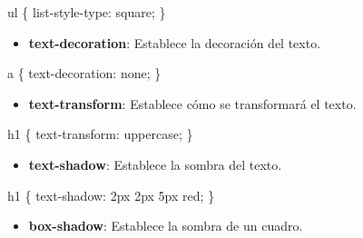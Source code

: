 \documentclass[
  a4paper,
  DIV=11,
  numbers=noendperiod,
  onepage,
  openany]{scrreprt}
\newenvironment{Shaded}{\begin{snugshade}}{\end{snugshade}}
\newcommand{\ConstantTok}[1]{\textcolor[rgb]{0.56,0.35,0.01}{#1}}
\newcommand{\DataTypeTok}[1]{\textcolor[rgb]{0.68,0.00,0.00}{#1}}
\newcommand{\DecValTok}[1]{\textcolor[rgb]{0.68,0.00,0.00}{#1}}
\newcommand{\KeywordTok}[1]{\textcolor[rgb]{0.00,0.23,0.31}{#1}}
\newcommand{\NormalTok}[1]{\textcolor[rgb]{0.00,0.23,0.31}{#1}}
\newcommand{\OperatorTok}[1]{\textcolor[rgb]{0.37,0.37,0.37}{#1}}
\providecommand{\tightlist}{%
  \setlength{\itemsep}{0pt}\setlength{\parskip}{0pt}}\usepackage{longtable,booktabs,array}
\begin{document}
\begin{Shaded}
\begin{Highlighting}[]
\NormalTok{ul \{}
  \KeywordTok{list{-}style{-}type}\NormalTok{: }\DecValTok{square}\OperatorTok{;}
\NormalTok{\}}
\end{Highlighting}
\end{Shaded}

\begin{itemize}
\tightlist
\item
  \textbf{text-decoration}: Establece la decoración del texto.
\end{itemize}

\begin{Shaded}
\begin{Highlighting}[]
\NormalTok{a \{}
  \KeywordTok{text{-}decoration}\NormalTok{: }\DecValTok{none}\OperatorTok{;}
\NormalTok{\}}
\end{Highlighting}
\end{Shaded}

\begin{itemize}
\tightlist
\item
  \textbf{text-transform}: Establece cómo se transformará el texto.
\end{itemize}

\begin{Shaded}
\begin{Highlighting}[]
\NormalTok{h1 \{}
  \KeywordTok{text{-}transform}\NormalTok{: }\DecValTok{uppercase}\OperatorTok{;}
\NormalTok{\}}
\end{Highlighting}
\end{Shaded}

\begin{itemize}
\tightlist
\item
  \textbf{text-shadow}: Establece la sombra del texto.
\end{itemize}

\begin{Shaded}
\begin{Highlighting}[]
\NormalTok{h1 \{}
  \KeywordTok{text{-}shadow}\NormalTok{: }\DecValTok{2}\DataTypeTok{px} \DecValTok{2}\DataTypeTok{px} \DecValTok{5}\DataTypeTok{px} \ConstantTok{red}\OperatorTok{;}
\NormalTok{\}}
\end{Highlighting}
\end{Shaded}

\begin{itemize}
\tightlist
\item
  \textbf{box-shadow}: Establece la sombra de un cuadro.
\end{itemize}
\end{document}

